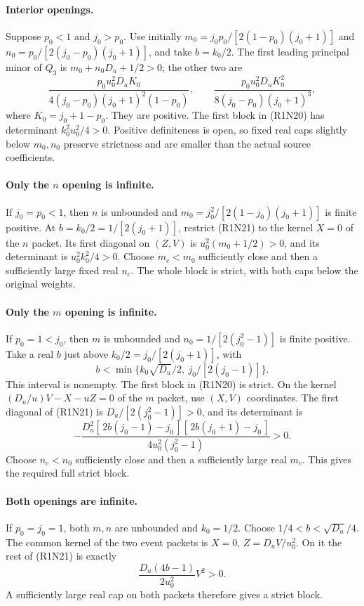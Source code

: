 \paragraph{Interior openings.}
Suppose $p_0<1$ and $j_0>p_0$.  Use initially
$m_0=j_0p_0/[2(1-p_0)(j_0+1)]$ and
$n_0=p_0/[2(j_0-p_0)(j_0+1)]$, and take $b=k_0/2$.
The first leading principal minor of $Q_3$ is
$m_0+n_0D_u+1/2>0$; the other two are
\[
 \frac{p_0u_0^2D_uK_0}
      {4(j_0-p_0)(j_0+1)^2(1-p_0)},\qquad
 \frac{p_0u_0^2D_uK_0^2}{8(j_0-p_0)(j_0+1)^3},          \tag{R1N22}
\]
where $K_0=j_0+1-p_0$.  They are positive.
The first block in (R1N20) has determinant
$k_0^2u_0^2/4>0$.  Positive definiteness is open, so fixed
real caps slightly below $m_0,n_0$ preserve strictness and are
smaller than the actual source coefficients.

\paragraph{Only the \(n\) opening is infinite.}
If $j_0=p_0<1$, then $n$ is unbounded and
$m_0=j_0^2/[2(1-j_0)(j_0+1)]$ is finite positive.
At $b=k_0/2=1/[2(j_0+1)]$, restrict (R1N21) to the kernel
$X=0$ of the $n$ packet.  Its first diagonal on $(Z,V)$ is
$u_0^2(m_0+1/2)>0$, and its determinant is
$u_0^2k_0^2/4>0$.  Choose $m_c<m_0$ sufficiently close and
then a sufficiently large fixed real $n_c$.  The whole block is
strict, with both caps below the original weights.

\paragraph{Only the \(m\) opening is infinite.}
If $p_0=1<j_0$, then $m$ is unbounded and
$n_0=1/[2(j_0^2-1)]$ is finite positive.
Take a real $b$ just above $k_0/2=j_0/[2(j_0+1)]$, with
\[
 b<\min\{k_0\sqrt{D_u}/2,\ j_0/[2(j_0-1)]\}.
\]
This interval is nonempty.  The first block in (R1N20) is strict.
On the kernel $(D_u/u)V-X-uZ=0$ of the $m$ packet, use $(X,V)$
coordinates.  The first diagonal of (R1N21) is
$D_u/[2(j_0^2-1)]>0$, and its determinant is
\[
 -\frac{D_u^2[\,2b(j_0-1)-j_0\,][\,2b(j_0+1)-j_0\,]}
        {4u_0^2(j_0^2-1)}>0.                            \tag{R1N23}
\]
Choose $n_c<n_0$ sufficiently close and then a sufficiently large
real $m_c$.  This gives the required full strict block.

\paragraph{Both openings are infinite.}
If $p_0=j_0=1$, both $m,n$ are unbounded and $k_0=1/2$.
Choose
$1/4<b<\sqrt{D_u}/4$.
The common kernel of the two event packets is
$X=0$, $Z=D_uV/u_0^2$.  On it the rest of (R1N21) is exactly
\[
 \frac{D_u(4b-1)}{2u_0^2}V^2>0.                        \tag{R1N24}
\]
A sufficiently large real cap on both packets therefore gives
a strict block.


